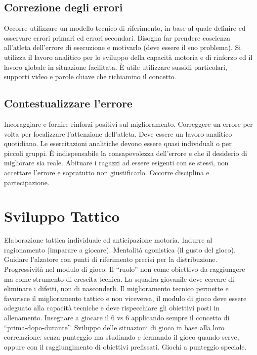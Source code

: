 \subsection{Correzione degli errori}
Occorre utilizzare un modello tecnico di riferimento, in base al quale definire ed osservare errori primari ed errori secondari. Bisogna far prendere coscienza all'atleta dell'errore di esecuzione e motivarlo (deve essere il suo problema). Si utilizza il lavoro analitico per lo sviluppo della capacità motoria e di rinforzo ed il lavoro globale in situazione facilitata.
\`E utile utilizzare sussidi particolari, supporti video e parole chiave che richiamino il concetto.

\subsection{Contestualizzare l'errore}
Incoraggiare e fornire rinforzi positivi sul miglioramento. Correggere un errore per volta per focalizzare l'attenzione dell'atleta. Deve essere un lavoro analitico quotidiano.
Le esercitazioni analitiche devono essere quasi individuali o per piccoli gruppi.
\`E indispensabile la consapevolezza dell'errore e che il desiderio di migliorare sia reale.
Abituare i ragazzi ad essere esigenti con se stessi, non accettare l'errore e sopratutto non giustificarlo. Occorre disciplina e partecipazione.

\section{Sviluppo Tattico}
Elaborazione tattica individuale ed anticipazione motoria.
Indurre al ragionamento (imparare a giocare).
Mentalità agonistica (il gusto del gioco).
Guidare l'alzatore con punti di riferimento precisi per la distribuzione.
Progressività nel modulo di gioco.
Il “ruolo” non come obiettivo da raggiungere ma come strumento di crescita tecnica.
La squadra giovanile deve cercare di eliminare i difetti, non di nasconderli.
Il miglioramento tecnico permette e favorisce il miglioramento tattico e non viceversa, il modulo di gioco deve essere adeguato alla capacità tecniche e deve rispecchiare gli obiettivi posti in allenamento.
Insegnare a giocare il 6 vs 6 applicando sempre il concetto di “prima-dopo-durante”.
Sviluppo delle situazioni di gioco in base alla loro correlazione: senza punteggio ma studiando e fermando il gioco quando serve, oppure con il raggiungimento di obiettivi prefissati.
Giochi a punteggio speciale.

